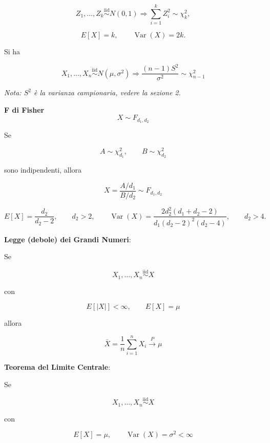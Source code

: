 \documentclass{article}
\begin{document}
\[
Z_1,\ldots,Z_k
\stackrel{\mathrm{iid}}{\sim}
N(0,1)
\Rightarrow
\sum_{i=1}^{k}Z_i^2
\sim\chi^2_k,
\]

\[
E[X]=k,
\qquad
\operatorname{Var}(X)=2k.
\]

Si ha

\[
X_1,\ldots,X_n
\stackrel{\mathrm{iid}}{\sim}
N(\mu,\sigma^2)\Rightarrow
\boxed{
\frac{(n-1)S^2}{\sigma^2}
\sim
\chi^2_{n-1}
}
\]\vspace{10pt}

\noindent\textit{Nota: $S^2$ è la varianza campionaria, vedere la sezione 2.}

\newpage


\noindent\textbf{F di Fisher} \[ \boxed{X\sim F_{d_1,d_2}} \]

Se

\[
A\sim\chi^2_{d_1},
\qquad
B\sim\chi^2_{d_2}
\]

sono indipendenti, allora

\[
X=
\frac{A/d_1}{B/d_2}
\sim
F_{d_1,d_2}
\]

\[
E[X]
=
\frac{d_2}{d_2-2},
\qquad d_2>2,\qquad
\operatorname{Var}(X)
=
\frac{2d_2^2(d_1+d_2-2)}
{d_1(d_2-2)^2(d_2-4)},
\qquad d_2>4.
\]


\noindent\textbf{Legge (debole) dei Grandi Numeri}:\newline

Se

\[
X_1,\ldots,X_n
\stackrel{\mathrm{iid}}{\sim}X
\]

con

\[
E[|X|]<\infty,
\qquad
E[X]=\mu
\]

allora

\[
\boxed{
\bar X
=
\frac1n\sum_{i=1}^{n}X_i
\overset{P}{\longrightarrow}
\mu
}
\]

\vspace{5pt}


\noindent\textbf{Teorema del Limite Centrale}:\newline

Se

\[
X_1,\ldots,X_n
\stackrel{\mathrm{iid}}{\sim}X
\]

con

\[
E[X]=\mu,
\qquad
\operatorname{Var}(X)=\sigma^2<\infty
\]
\end{document}

